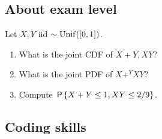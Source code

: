 \documentclass[assignments]{subfiles}
\begin{document}
\subsection{About exam level}
\label{sec:chapter-8}

\begin{exercise}
Let $X, Y$ iid $\sim \Unif{[0,1]}$.
\begin{enumerate}
\item What is the joint CDF of $X+Y, XY$?
\item What is the joint PDF of $X+^Y XY$?
\item Compute $\P{X+Y\leq 1, XY\leq 2/9}$.
\end{enumerate}
\end{exercise}

\subsection{Coding skills}
\label{sec:coding-skills-1}
\end{document}

